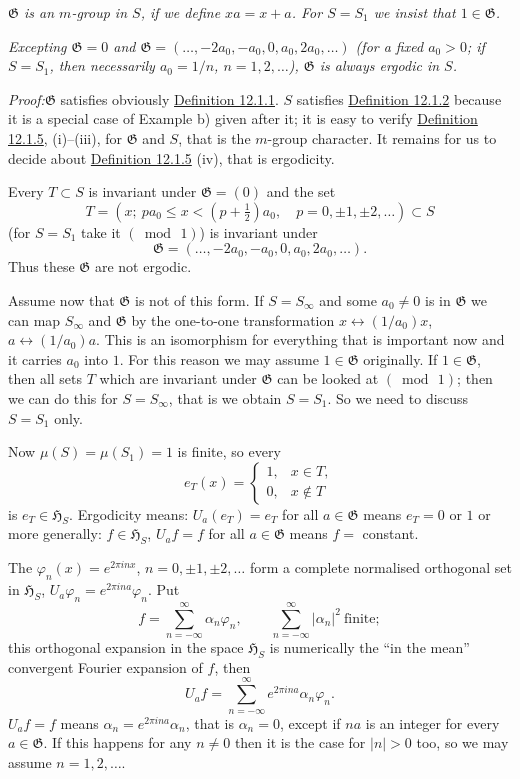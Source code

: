\documentclass[12pt,b5paper,twoside]{article}
\newcommand{\Hspace}{\mathfrak H}
\newcommand{\Proof}{\par\noindent\textit{Proof:}\enspace}
\newcommand{\defref}[1]{\hyperref[def:#1]{Definition #1}}
\begin{document}
\emph{$\mathfrak G$ is an $m$-group in $S$, if we define $xa=x+a$. For
$S=S_1$ we insist that $1\in\mathfrak G$.}

\emph{Excepting $\mathfrak G=0$ and
$\mathfrak G=(\ldots,-2a_0,-a_0,0,a_0,2a_0,\ldots)$ (for a fixed $a_0>0$;
if $S=S_1$, then necessarily $a_0=1/n$, $n=1,2,\ldots$), $\mathfrak G$ is
always ergodic in $S$.}

\Proof $\mathfrak G$ satisfies obviously \defref{12.1.1}. $S$ satisfies
\defref{12.1.2} because it is a special case of Example b) given after it;
it is easy to verify \defref{12.1.5}, (i)--(iii), for $\mathfrak G$ and $S$,
that is the $m$-group character. It remains for us to decide about
\defref{12.1.5} (iv), that is ergodicity.

Every $T\subset S$ is invariant under $\mathfrak G=(0)$ and the set
\[
 T=(x;\ pa_0\leq x<(p+\tfrac12)a_0,
          \quad p=0,\pm1,\pm2,\ldots)\subset S
\]
(for $S=S_1$ take it $(\bmod\,1)$) is invariant under
\[
 \mathfrak G=(\ldots,-2a_0,-a_0,0,a_0,2a_0,\ldots).
\]
Thus these $\mathfrak G$ are not ergodic.

Assume now that $\mathfrak G$ is not of this form. If $S=S_\infty$ and some
$a_0\neq0$ is in $\mathfrak G$ we can map $S_\infty$ and $\mathfrak G$ by
the one-to-one transformation
$x\longleftrightarrow(1/a_0)x$, $a\longleftrightarrow(1/a_0)a$. This is an
isomorphism for everything that is important now and it carries $a_0$ into
$1$. For this reason we may assume $1\in\mathfrak G$ originally. If
$1\in\mathfrak G$, then all sets $T$ which are invariant under
$\mathfrak G$ can be looked at $(\bmod\,1)$; then we can do this for
$S=S_\infty$, that is we obtain $S=S_1$. So we need to discuss $S=S_1$ only.

Now $\mu(S)=\mu(S_1)=1$ is finite, so every
\[
 e_T(x)=\begin{cases}
  1,&x\in T,\\
  0,&x\notin T
 \end{cases}
\]
is $e_T\in\Hspace_S$. Ergodicity means: $U_a(e_T)=e_T$ for all
$a\in\mathfrak G$ means $e_T=0$ or $1$ or more generally:
$f\in\Hspace_S$, $U_af=f$ for all $a\in\mathfrak G$ means $f={}$ constant.

The $\varphi_n(x)=e^{2\pi i n x}$, $n=0,\pm1,\pm2,\ldots$ form a complete
normalised orthogonal set in $\Hspace_S$,
$U_a\varphi_n=e^{2\pi i n a}\varphi_n$.
Put
\[
 f=\sum_{n=-\infty}^{\infty}\alpha_n\varphi_n,
 \qquad \sum_{n=-\infty}^{\infty}|\alpha_n|^2\ \text{finite};
\]
this orthogonal expansion in the space $\Hspace_S$ is numerically the ``in the
mean'' convergent Fourier expansion of $f$, then
\[
 U_af=\sum_{n=-\infty}^{\infty}e^{2\pi i n a}\alpha_n\varphi_n.
\]
$U_af=f$ means $\alpha_n=e^{2\pi i n a}\alpha_n$, that is $\alpha_n=0$,
except if $na$ is an integer for every $a\in\mathfrak G$. If this happens
for any $n\neq0$ then it is the case for $|n|>0$ too, so we may assume
$n=1,2,\ldots$.
\end{document}

